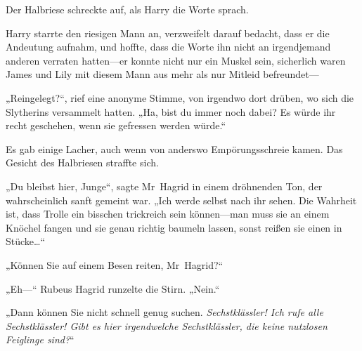 Der Halbriese schreckte auf, als Harry die Worte sprach.

Harry starrte den riesigen Mann an, verzweifelt darauf bedacht, dass er die Andeutung aufnahm, und hoffte, dass die Worte ihn nicht an irgendjemand anderen verraten hatten—er konnte nicht nur ein Muskel sein, sicherlich waren James und Lily mit diesem Mann aus mehr als nur Mitleid befreundet—

„Reingelegt?“, rief eine anonyme Stimme, von irgendwo dort drüben, wo sich die Slytherins versammelt hatten.
„Ha, bist du immer noch dabei? Es würde ihr recht geschehen, wenn sie gefressen werden würde.“

Es gab einige Lacher, auch wenn von anderswo Empörungsschreie kamen. Das Gesicht des Halbriesen straffte sich.

„Du bleibst hier, Junge“, sagte Mr~Hagrid in einem dröhnenden Ton, der wahrscheinlich sanft gemeint war.
„Ich werde selbst nach ihr sehen. Die Wahrheit ist, dass Trolle ein bisschen trickreich sein können—man muss sie an einem Knöchel fangen und sie genau richtig baumeln lassen, sonst reißen sie einen in Stücke…“

„Können Sie auf einem Besen reiten, Mr~Hagrid?“

„Eh—“ Rubeus Hagrid runzelte die Stirn.
„Nein.“

„Dann können Sie nicht schnell genug suchen. \emph{Sechstklässler! Ich rufe alle Sechstklässler! Gibt es hier irgendwelche Sechstklässler, die keine nutzlosen Feiglinge sind?}“

